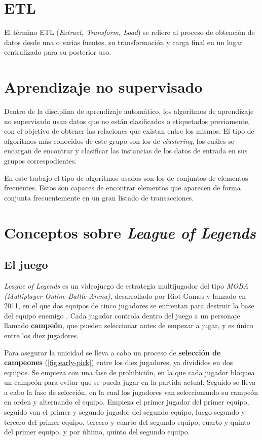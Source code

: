 
\section{ETL}
El término ETL (\textit{Extract, Transform, Load}) se refiere al proceso de obtención de datos desde una o varias fuentes, su transformación y carga final en un lugar centralizado para su posterior uso.

\section{Aprendizaje no supervisado}
Dentro de la disciplina de aprendizaje automático, los algoritmos de aprendizaje no supervisado usan datos que no están clasificados o etiquetados previamente, con el objetivo de obtener las relaciones que existan entre los mismos. El tipo de algoritmos más conocidos de este grupo son los de \textit{clustering}, los cuáles se encargan de encontrar y clasificar las instancias de los datos de entrada en sus grupos correspodientes.

En este trabajo el tipo de algoritmos usados son los de conjuntos de elementos frecuentes. Estos son capaces de encontrar elementos que aparecen de forma conjunta frecuentemente en un gran listado de transacciones.

\section{Conceptos sobre \textit{League of Legends}}
\label{sec:lol-conceptos}
\subsection{El juego}
\textit{League of Legends} es un videojuego de estrategia multijugador del tipo \textit{MOBA (Multiplayer Online Battle Arena)}, desarrollado por Riot Games y lanzado en 2011, en el que dos equipos de cinco jugadores se enfrentan para destruir la base del equipo enemigo \cite{misc:como-jugar}. Cada jugador controla dentro del juego a un personaje llamado \textbf{campeón}, que pueden seleccionar antes de empezar a jugar, y es único entre los diez jugadores.

Para asegurar la unicidad se lleva a cabo un proceso de \textbf{selección de campeones} (\ref{fig:early-pick}) entre los diez jugadores, ya divididos en dos equipos. Se empieza con una fase de prohibición, en la que cada jugador bloquea un campeón para evitar que se pueda jugar en la partida actual. Seguido se lleva a cabo la fase de selección, en la cual los jugadores van seleccionando su campeón en orden y alternando el equipo. Empieza el primer jugador del primer equipo, seguido van el primer y segundo jugador del segundo equipo, luego segundo y tercero del primer equipo, tercero y cuarto del segundo equipo, cuarto y quinto del primer equipo, y por último, quinto del segundo equipo.

